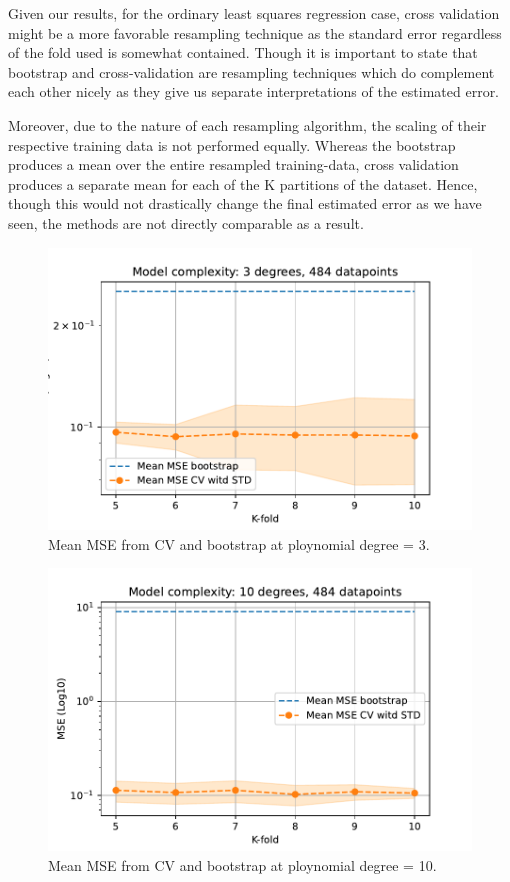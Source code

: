 \documentclass[11pt, a4paper]{article}
\begin{document}
Given our results, for the ordinary least squares regression case, cross validation might be a more favorable resampling technique as the standard error regardless of the fold used is somewhat contained. Though it is important to state that bootstrap and cross-validation are resampling techniques which do complement each other nicely as they give us separate interpretations of the estimated error.

Moreover, due to the nature of each resampling algorithm, the scaling of their respective training data is not performed equally. Whereas the bootstrap produces a mean over the entire resampled training-data, cross validation produces a separate mean for each of the K partitions of the dataset. Hence, though this would not drastically change the final estimated error as we have seen, the methods are not directly comparable as a result.

\begin{figure}
  \centering
  \includegraphics[scale=0.70]{figures/EX3_mse_cv_boot3.pdf}
  \caption{\label{fig:mse_cv_boot1} Mean MSE from CV and bootstrap at ploynomial degree = 3.}
\end{figure}



\begin{figure}
  \centering
  \includegraphics[scale=0.70]{figures/EX3_mse_cv_boot10.pdf}
  \caption{\label{fig:mse_cv_boot2}Mean MSE from CV and bootstrap at ploynomial degree = 10.}
\end{figure}
\end{document}
